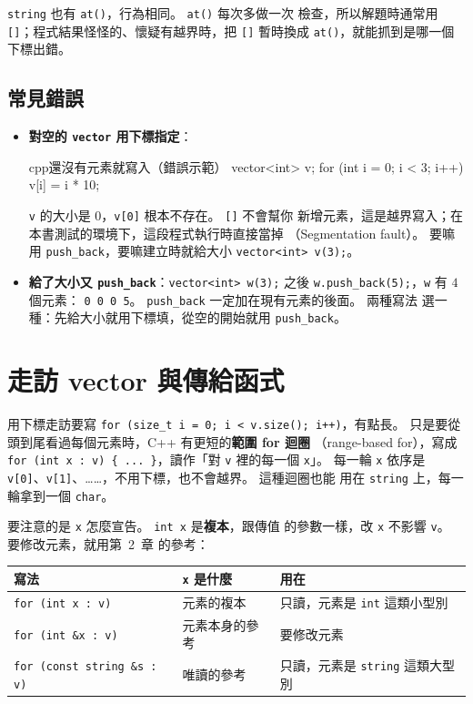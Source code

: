 \texttt{string} 也有 \texttt{at()}，行為相同。 \texttt{at()} 每次多做一次
檢查，所以解題時通常用 \texttt{[]}；程式結果怪怪的、懷疑有越界時，把
\texttt{[]} 暫時換成 \texttt{at()}，就能抓到是哪一個下標出錯。

\subsection{常見錯誤}

\begin{itemize}
\item \textbf{對空的 \texttt{vector} 用下標指定}：
\begin{code}{cpp}{還沒有元素就寫入（錯誤示範）}
vector<int> v;
for (int i = 0; i < 3; i++) {
    v[i] = i * 10;
}
\end{code}
\texttt{v} 的大小是 $0$，\texttt{v[0]} 根本不存在。 \texttt{[]} 不會幫你
新增元素，這是越界寫入；在本書測試的環境下，這段程式執行時直接當掉
（Segmentation fault）。 要嘛用 \texttt{push\_back}，要嘛建立時就給大小
\texttt{vector<int> v(3);}。
\item \textbf{給了大小又 \texttt{push\_back}}：\texttt{vector<int> w(3);}
之後 \texttt{w.push\_back(5);}，\texttt{w} 有 $4$ 個元素：
\texttt{0 0 0 5}。 \texttt{push\_back} 一定加在現有元素的後面。 兩種寫法
選一種：先給大小就用下標填，從空的開始就用 \texttt{push\_back}。
\end{itemize}

\section{走訪 vector 與傳給函式}
\label{sec:range-for}

用下標走訪要寫 \texttt{for (size\_t i = 0; i < v.size(); i++)}，有點長。
只是要從頭到尾看過每個元素時，C++ 有更短的\textbf{範圍 for 迴圈}
（range-based for），寫成 \texttt{for (int x : v) \{ ... \}}，讀作「對
\texttt{v} 裡的每一個 \texttt{x}」。 每一輪 \texttt{x} 依序是
\texttt{v[0]}、\texttt{v[1]}、……，不用下標，也不會越界。 這種迴圈也能
用在 \texttt{string} 上，每一輪拿到一個 \texttt{char}。

要注意的是 \texttt{x} 怎麼宣告。 \texttt{int x} 是\textbf{複本}，跟傳值
的參數一樣，改 \texttt{x} 不影響 \texttt{v}。 要修改元素，就用第~2~章
的參考：

\begin{center}
\begin{tabular}{lll}
\toprule
寫法 & \texttt{x} 是什麼 & 用在 \\
\midrule
\texttt{for (int x : v)} & 元素的複本 & 只讀，元素是 \texttt{int} 這類小型別 \\
\texttt{for (int \&x : v)} & 元素本身的參考 & 要修改元素 \\
\texttt{for (const string \&s : v)} & 唯讀的參考 & 只讀，元素是 \texttt{string} 這類大型別 \\
\bottomrule
\end{tabular}
\end{center}

